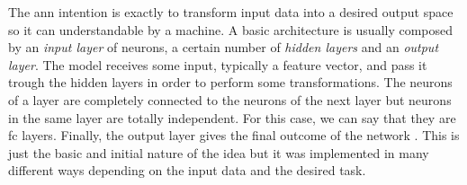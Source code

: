	The \acrshort{ann} intention is exactly to transform input data into a desired output space so it can understandable by a machine. A basic architecture is usually composed by an \textit{input layer} of neurons, a certain number of \textit{hidden layers} and an \textit{output layer}. The model receives some input, typically a feature vector, and pass it trough the hidden layers in order to perform some transformations. The neurons of a layer are completely connected to the neurons of the next layer but neurons in the same layer are totally independent. For this case, we can say that they are \acrfull{fc} layers. Finally, the output layer gives the final outcome of the network \cite{Kwon2011}. This is just the basic and initial nature of the idea but it was implemented in many different ways depending on the input data and the desired task.
	
	


	
	
	
	

	
	
	
	
	
	
	
	